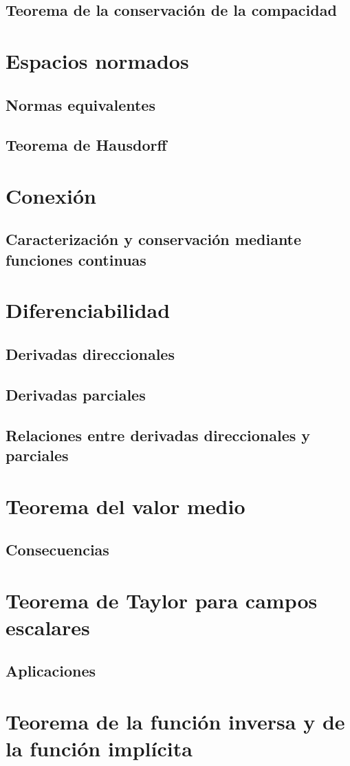 \documentclass[11pt,titlepage,a4paper]{article}
\begin{document}
\subsection{Teorema de la conservación de la compacidad}
\section{Espacios normados}
\subsection{Normas equivalentes}
\subsection{Teorema de Hausdorff}
\section{Conexión}
\subsection{Caracterización y conservación mediante funciones continuas}
\section{Diferenciabilidad}
\subsection{Derivadas direccionales}
\subsection{Derivadas parciales}
\subsection{Relaciones entre derivadas direccionales y parciales}
\section{Teorema del valor medio}
\subsection{Consecuencias}
\section{Teorema de Taylor para campos escalares}
\subsection{Aplicaciones}
\section{Teorema de la función inversa y de la función implícita}
\end{document}
